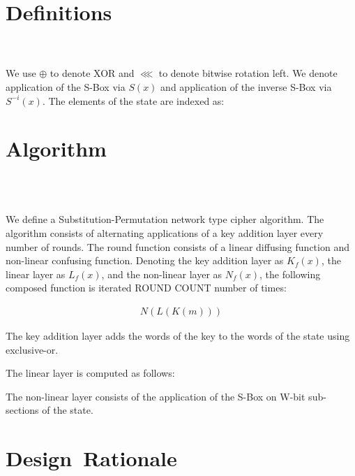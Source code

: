 \documentclass[preprint]{iacrtrans}
\begin{document}


\section{Definitions}
\\
\\
We use $\oplus$ to denote XOR and $\lll$ to denote bitwise rotation left. We denote application of the S-Box via $S(x)$ and application of the inverse S-Box via $S^{-i}(x)$. The elements of the state are indexed as: 

\section{Algorithm}
\\
\\

 We define a Substitution-Permutation network type cipher algorithm. The algorithm consists of alternating applications of a key addition layer every number of rounds.  The round function consists of a linear diffusing function and non-linear confusing function. Denoting the key addition layer as $K_f(x)$, the linear layer as $L_f(x)$, and the non-linear layer as $N_f(x)$, the following composed function is iterated ROUND COUNT  number of times:

\begin{align}
   N(L(K(m)))
\end{align}

The key addition layer adds the words of the key to the words of the state using exclusive-or. 

The linear layer is computed as follows: 

The non-linear layer consists of the application of the S-Box on W-bit sub-sections of the state. 

\section{Design\ Rationale}
\\
\\
\\
\\
\end{document}
